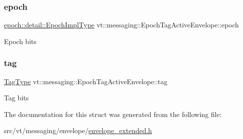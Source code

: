 \subsubsection{\texorpdfstring{epoch}{epoch}}
{\footnotesize\ttfamily \hyperlink{namespacevt_1_1epoch_1_1detail_a9adc5df96a521e516dc20511eb553075}{epoch\+::detail\+::\+Epoch\+Impl\+Type} vt\+::messaging\+::\+Epoch\+Tag\+Active\+Envelope\+::epoch}

Epoch bits \mbox{\label{structvt_1_1messaging_1_1_epoch_tag_active_envelope_aafb75781896b2eebe8cf1feae02c46f5}} 
\subsubsection{\texorpdfstring{tag}{tag}}
{\footnotesize\ttfamily \hyperlink{namespacevt_a84ab281dae04a52a4b243d6bf62d0e52}{Tag\+Type} vt\+::messaging\+::\+Epoch\+Tag\+Active\+Envelope\+::tag}

Tag bits 

The documentation for this struct was generated from the following file\+:\begin{DoxyCompactItemize}
\item 
src/vt/messaging/envelope/\hyperlink{envelope__extended_8h}{envelope\+\_\+extended.\+h}\end{DoxyCompactItemize}
